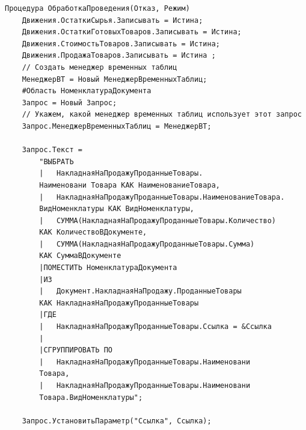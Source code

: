 \documentclass[12pt,a4paper]{article}
\begin{document}
\begin{appendices}
\begin{verbatim}
Процедура ОбработкаПроведения(Отказ, Режим) 
    Движения.ОстаткиСырья.Записывать = Истина;       
    Движения.ОстаткиГотовыхТоваров.Записывать = Истина;	  
    Движения.СтоимостьТоваров.Записывать = Истина; 
    Движения.ПродажаТоваров.Записывать = Истина ;                                      
    // Создать менеджер временных таблиц
    МенеджерВТ = Новый МенеджерВременныхТаблиц;
    #Область НоменклатураДокумента
    Запрос = Новый Запрос;
    // Укажем, какой менеджер временных таблиц использует этот запрос
    Запрос.МенеджерВременныхТаблиц = МенеджерВТ;

    Запрос.Текст = 
        "ВЫБРАТЬ
        |	НакладнаяНаПродажуПроданныеТовары.
        Наименовани Товара КАК НаименованиеТовара,
        |	НакладнаяНаПродажуПроданныеТовары.НаименованиеТовара.
        ВидНоменклатуры КАК ВидНоменклатуры,
        |	СУММА(НакладнаяНаПродажуПроданныеТовары.Количество)
        КАК КоличествоВДокументе,
        |	СУММА(НакладнаяНаПродажуПроданныеТовары.Сумма)
        КАК СуммаВДокументе
        |ПОМЕСТИТЬ НоменклатураДокумента
        |ИЗ
        |	Документ.НакладнаяНаПродажу.ПроданныеТовары
        КАК НакладнаяНаПродажуПроданныеТовары
        |ГДЕ
        |	НакладнаяНаПродажуПроданныеТовары.Ссылка = &Ссылка
        |
        |СГРУППИРОВАТЬ ПО
        |	НакладнаяНаПродажуПроданныеТовары.Наименовани
        Товара,
        |	НакладнаяНаПродажуПроданныеТовары.Наименовани
        Товара.ВидНоменклатуры";
	
    Запрос.УстановитьПараметр("Ссылка", Ссылка);
	

\end{verbatim}
\end{appendices}
\end{document}
